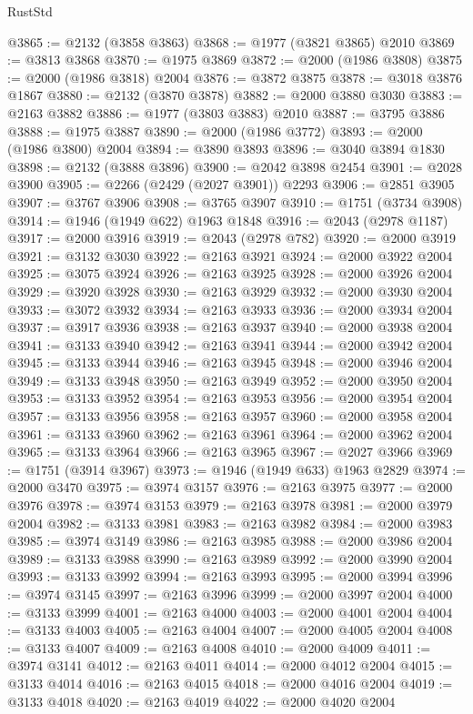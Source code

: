 \begin{lexlean}{RustStd}
\begin{coremodule}
@3865 := @2132 (@3858 @3863)
@3868 := @1977 (@3821 @3865) @2010
@3869 := @3813 @3868
@3870 := @1975 @3869
@3872 := @2000 (@1986 @3808)
@3875 := @2000 (@1986 @3818) @2004
@3876 := @3872 @3875
@3878 := @3018 @3876 @1867
@3880 := @2132 (@3870 @3878)
@3882 := @2000 @3880 @3030
@3883 := @2163 @3882
@3886 := @1977 (@3803 @3883) @2010
@3887 := @3795 @3886
@3888 := @1975 @3887
@3890 := @2000 (@1986 @3772)
@3893 := @2000 (@1986 @3800) @2004
@3894 := @3890 @3893
@3896 := @3040 @3894 @1830
@3898 := @2132 (@3888 @3896)
@3900 := @2042 @3898 @2454
@3901 := @2028 @3900
@3905 := @2266 (@2429 (@2027 @3901)) @2293
@3906 := @2851 @3905
@3907 := @3767 @3906
@3908 := @3765 @3907
@3910 := @1751 (@3734 @3908)
@3914 := @1946 (@1949 @622) @1963 @1848
@3916 := @2043 (@2978 @1187)
@3917 := @2000 @3916
@3919 := @2043 (@2978 @782)
@3920 := @2000 @3919
@3921 := @3132 @3030
@3922 := @2163 @3921
@3924 := @2000 @3922 @2004
@3925 := @3075 @3924
@3926 := @2163 @3925
@3928 := @2000 @3926 @2004
@3929 := @3920 @3928
@3930 := @2163 @3929
@3932 := @2000 @3930 @2004
@3933 := @3072 @3932
@3934 := @2163 @3933
@3936 := @2000 @3934 @2004
@3937 := @3917 @3936
@3938 := @2163 @3937
@3940 := @2000 @3938 @2004
@3941 := @3133 @3940
@3942 := @2163 @3941
@3944 := @2000 @3942 @2004
@3945 := @3133 @3944
@3946 := @2163 @3945
@3948 := @2000 @3946 @2004
@3949 := @3133 @3948
@3950 := @2163 @3949
@3952 := @2000 @3950 @2004
@3953 := @3133 @3952
@3954 := @2163 @3953
@3956 := @2000 @3954 @2004
@3957 := @3133 @3956
@3958 := @2163 @3957
@3960 := @2000 @3958 @2004
@3961 := @3133 @3960
@3962 := @2163 @3961
@3964 := @2000 @3962 @2004
@3965 := @3133 @3964
@3966 := @2163 @3965
@3967 := @2027 @3966
@3969 := @1751 (@3914 @3967)
@3973 := @1946 (@1949 @633) @1963 @2829
@3974 := @2000 @3470
@3975 := @3974 @3157
@3976 := @2163 @3975
@3977 := @2000 @3976
@3978 := @3974 @3153
@3979 := @2163 @3978
@3981 := @2000 @3979 @2004
@3982 := @3133 @3981
@3983 := @2163 @3982
@3984 := @2000 @3983
@3985 := @3974 @3149
@3986 := @2163 @3985
@3988 := @2000 @3986 @2004
@3989 := @3133 @3988
@3990 := @2163 @3989
@3992 := @2000 @3990 @2004
@3993 := @3133 @3992
@3994 := @2163 @3993
@3995 := @2000 @3994
@3996 := @3974 @3145
@3997 := @2163 @3996
@3999 := @2000 @3997 @2004
@4000 := @3133 @3999
@4001 := @2163 @4000
@4003 := @2000 @4001 @2004
@4004 := @3133 @4003
@4005 := @2163 @4004
@4007 := @2000 @4005 @2004
@4008 := @3133 @4007
@4009 := @2163 @4008
@4010 := @2000 @4009
@4011 := @3974 @3141
@4012 := @2163 @4011
@4014 := @2000 @4012 @2004
@4015 := @3133 @4014
@4016 := @2163 @4015
@4018 := @2000 @4016 @2004
@4019 := @3133 @4018
@4020 := @2163 @4019
@4022 := @2000 @4020 @2004

\end{coremodule}
\end{lexlean}
